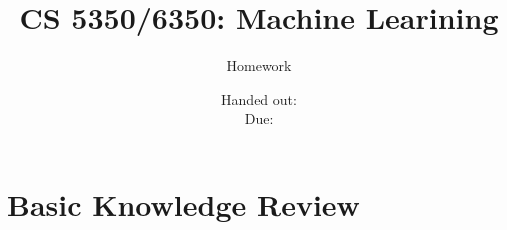 \documentclass[12pt, fullpage,letterpaper]{article}
\title{CS 5350/6350: Machine Learining \semester}
\author{Homework \assignmentId}
\date{Handed out: \releaseDate\\
  Due: \dueDate}
\begin{document}
\maketitle





\section*{Basic Knowledge Review}
\label{sec:q1}

\end{document}
